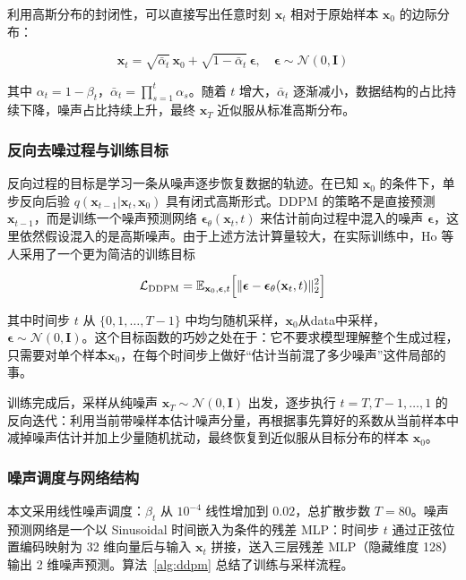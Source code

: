 \documentclass[UTF8,a4paper,12pt]{ctexart}
\newcommand{\Ncal}{\mathcal{N}}
\newcommand{\E}{\mathbb{E}}
\begin{document}
利用高斯分布的封闭性，可以直接写出任意时刻 $\mathbf{x}_t$ 相对于原始样本 $\mathbf{x}_0$ 的边际分布：

\begin{equation}
    \mathbf{x}_t = \sqrt{\bar{\alpha}_t}\,\mathbf{x}_0 + \sqrt{1-\bar{\alpha}_t}\,\boldsymbol{\epsilon},\quad \boldsymbol{\epsilon}\sim\Ncal(0,\mathbf{I})
\end{equation}

其中 $\alpha_t = 1-\beta_t$，$\bar{\alpha}_t = \prod_{s=1}^{t}\alpha_s$。随着 $t$ 增大，$\bar{\alpha}_t$ 逐渐减小，数据结构的占比持续下降，噪声占比持续上升，最终 $\mathbf{x}_T$ 近似服从标准高斯分布。

\subsubsection{反向去噪过程与训练目标}

反向过程的目标是学习一条从噪声逐步恢复数据的轨迹。在已知 $\mathbf{x}_0$ 的条件下，单步反向后验 $q(\mathbf{x}_{t-1}|\mathbf{x}_t,\mathbf{x}_0)$ 具有闭式高斯形式。DDPM 的策略不是直接预测 $\mathbf{x}_{t-1}$，而是训练一个噪声预测网络 $\boldsymbol{\epsilon}_{\theta}(\mathbf{x}_t,t)$ 来估计前向过程中混入的噪声 $\boldsymbol{\epsilon}$，这里依然假设混入的是高斯噪声。由于上述方法计算量较大，在实际训练中，Ho 等人\cite{ho2020ddpm}采用了一个更为简洁的训练目标

\begin{equation}
    \mathcal{L}_{\mathrm{DDPM}} = \E_{\mathbf{x}_0,\boldsymbol{\epsilon},t}\Bigl[\|\boldsymbol{\epsilon} - \boldsymbol{\epsilon}_{\theta}(\mathbf{x}_t,t)\|_2^2\Bigr]
\end{equation}

其中时间步 $t$ 从 $\{0,1,\dots,T-1\}$ 中均匀随机采样，$\mathbf{x}_0$从data中采样，$\boldsymbol{\epsilon} \sim \Ncal(0,\mathbf{I})$。这个目标函数的巧妙之处在于：它不要求模型理解整个生成过程，只需要对单个样本$\mathbf{x}_0$，在每个时间步上做好“估计当前混了多少噪声”这件局部的事。

训练完成后，采样从纯噪声 $\mathbf{x}_T\sim\Ncal(0,\mathbf{I})$ 出发，逐步执行 $t=T,T-1,\dots,1$ 的反向迭代：利用当前带噪样本估计噪声分量，再根据事先算好的系数从当前样本中减掉噪声估计并加上少量随机扰动，最终恢复到近似服从目标分布的样本 $\mathbf{x}_0$。

\subsubsection{噪声调度与网络结构}

本文采用线性噪声调度：$\beta_t$ 从 $10^{-4}$ 线性增加到 $0.02$，总扩散步数 $T=80$。噪声预测网络是一个以 Sinusoidal 时间嵌入为条件的残差 MLP：时间步 $t$ 通过正弦位置编码映射为 32 维向量后与输入 $\mathbf{x}_t$ 拼接，送入三层残差 MLP（隐藏维度 128）输出 2 维噪声预测。算法~\ref{alg:ddpm} 总结了训练与采样流程。
\end{document}
